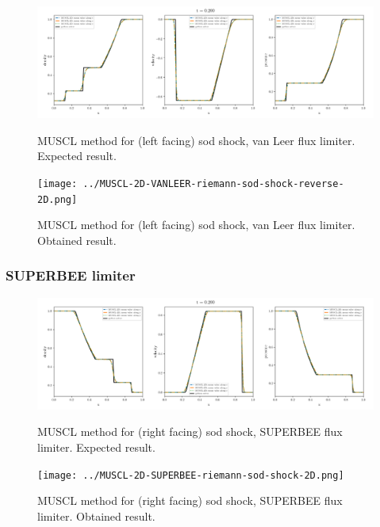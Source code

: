     \begin{figure}[htbp]
        \centering
        \includegraphics[width=.9\textwidth]{./figures/MUSCL-2D-VANLEER-riemann-sod-shock-reverse-2D.png}%
        \caption{MUSCL method for (left facing) sod shock, van Leer flux limiter. Expected result.}
        \texttt{[image: ../MUSCL-2D-VANLEER-riemann-sod-shock-reverse-2D.png]}%
        \caption{MUSCL method for (left facing) sod shock, van Leer flux limiter. Obtained result.}
    \end{figure}






\clearpage
\subsubsection{SUPERBEE limiter}

    \begin{figure}[htbp]
        \centering
        \includegraphics[width=.9\textwidth]{./figures/MUSCL-2D-SUPERBEE-riemann-sod-shock-2D.png}%
        \caption{MUSCL method for (right facing) sod shock, SUPERBEE flux limiter. Expected result.}
        \texttt{[image: ../MUSCL-2D-SUPERBEE-riemann-sod-shock-2D.png]}%
        \caption{MUSCL method for (right facing) sod shock, SUPERBEE flux limiter. Obtained result.}
    \end{figure}


